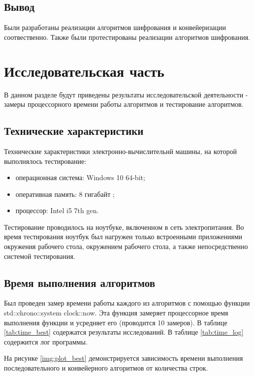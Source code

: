 \subsection{Вывод}

Были разработаны реализации алгоритмов шифрования и конвейеризации соотвественно. Также были протестированы реализации алгоритмов шифрования.

\section{Исследовательская часть}
В данном разделе будут приведены результаты исследовательской деятельности - замеры процессорного времени работы алгоритмов и тестирование алгоритмов.

\subsection{Технические характеристики}

Технические характеристики электронно-вычислительнй машины, на которой выполнялось тестирование:

\begin{itemize}
    \item операционная система: Windows 10 64-bit;
    \item оперативная память: 8 гигабайт ;
    \item процессор: Intel i5 7th gen.
\end{itemize}


Тестирование проводилось на ноутбуке, включенном в сеть электропитания. Во время тестирования ноутбук был нагружен только встроенными приложениями окружения рабочего стола, окружением рабочего стола, а также непосредственно системой тестирования.

\subsection{Время выполнения алгоритмов}

Был проведен замер времени работы каждого из алгоритмов с помощью функции std::chrono::system clock::now. Эта функция замеряет процессорное время выполнения функции и усредняет его (проводится 10 замеров). В таблице \ref{tab:time_best} содержатся результаты исследований. В таблице \ref{tab:time_log} содержится лог программы.

На рисунке \ref{img:plot_best} демонстрируется зависимость времени выполнения последовательного и конвейерного алгоритмов от количества строк. \\

